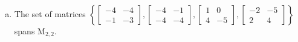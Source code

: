 \begin{exerciseAnswer}
\begin{enumerate}[(a)]
\item The set of matrices \( \left\{ \left[\begin{array}{cc}
-4 & -4 \\
-1 & -3
\end{array}\right] , \left[\begin{array}{cc}
-4 & -1 \\
-4 & -4
\end{array}\right] , \left[\begin{array}{cc}
1 & 0 \\
4 & -5
\end{array}\right] , \left[\begin{array}{cc}
-2 & -5 \\
2 & 4
\end{array}\right] \right\} \) spans \(\mathrm{M}_{2,2}\). 
\end{enumerate}
    
\end{exerciseAnswer}
    
